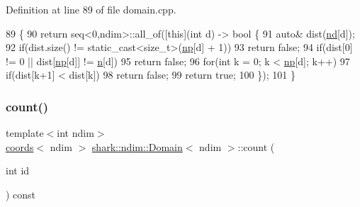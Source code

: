 Definition at line 89 of file domain.\+cpp.


\begin{DoxyCode}
89                                                 \{
90     \textcolor{keywordflow}{return} seq<0,ndim>::all\_of([\textcolor{keyword}{this}](\textcolor{keywordtype}{int} d) -> \textcolor{keywordtype}{bool} \{
91         \textcolor{keyword}{auto}& dist(\hyperlink{classshark_1_1ndim_1_1_domain_a4964336cc4ccdb2bfcc616fdcbb9a570}{nd}[d]);
92         \textcolor{keywordflow}{if}(dist.size() != \textcolor{keyword}{static\_cast<}\textcolor{keywordtype}{size\_t}\textcolor{keyword}{>}(\hyperlink{classshark_1_1ndim_1_1_domain_a1d15ab99cb54dcc456c5bba8699bcddf}{np}[d] + 1))
93             \textcolor{keywordflow}{return} \textcolor{keyword}{false};
94         \textcolor{keywordflow}{if}(dist[0] != 0 || dist[\hyperlink{classshark_1_1ndim_1_1_domain_a1d15ab99cb54dcc456c5bba8699bcddf}{np}[d]] != \hyperlink{classshark_1_1ndim_1_1_domain_ab942ffcf99c5ee0f2589c8b9104abcfd}{n}[d])
95             \textcolor{keywordflow}{return} \textcolor{keyword}{false};
96         \textcolor{keywordflow}{for}(\textcolor{keywordtype}{int} k = 0; k < \hyperlink{classshark_1_1ndim_1_1_domain_a1d15ab99cb54dcc456c5bba8699bcddf}{np}[d]; k++)
97             \textcolor{keywordflow}{if}(dist[k+1] < dist[k])
98                 \textcolor{keywordflow}{return} \textcolor{keyword}{false};
99         \textcolor{keywordflow}{return} \textcolor{keyword}{true};
100     \});
101 \}
\end{DoxyCode}
\hypertarget{classshark_1_1ndim_1_1_domain_a2539860488c03f96be5fddd54f6f99c0}{}\label{classshark_1_1ndim_1_1_domain_a2539860488c03f96be5fddd54f6f99c0} 
\subsubsection{\texorpdfstring{count()}{count()}\hspace{0.1cm}{\footnotesize\ttfamily [1/2]}}
{\footnotesize\ttfamily template$<$int ndim$>$ \\
\hyperlink{structshark_1_1ndim_1_1coords}{coords}$<$ ndim $>$ \hyperlink{classshark_1_1ndim_1_1_domain}{shark\+::ndim\+::\+Domain}$<$ ndim $>$\+::count (\begin{DoxyParamCaption}\item[{int}]{id }\end{DoxyParamCaption}) const\hspace{0.3cm}{\ttfamily [inline]}}

